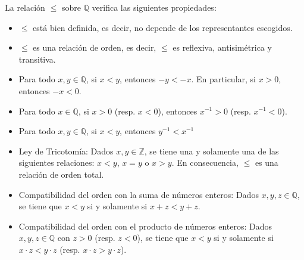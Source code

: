 \begin{proposition}
  \rm La relación $\leq$ sobre $\mathbb{Q}$ verifica las siguientes propiedades:
  \begin{itemize}
    \item[1.] $\leq$ está bien definida, es decir, no depende de los representantes escogidos.
    \item[2.] $\leq$ es una relación de orden, es decir, $\leq$ es reflexiva, antisimétrica y transitiva.
    \item[3.] Para todo $x,y\in\mathbb{Q}$, si $x<y$, entonces $-y<-x$. En particular, si $x>0$, entonces $-x<0$.
    \item[4.] Para todo $x\in\mathbb{Q}$, si $x>0$ (resp. $x<0$), entonces $x^{-1}>0$ (resp. $x^{-1}<0$).
    \item[5.] Para todo $x,y\in\mathbb{Q}$, si $x<y$, entonces $y^{-1}<x^{-1}$ 
    \item[6.] Ley de Tricotomía: Dados $x,y\in\mathbb{Z}$, se tiene una y solamente una de las siguientes relaciones: $x<y$, $x=y$ o $x>y$. En consecuencia, $\leq$ es una relación de orden total.
    \item[7.] Compatibilidad del orden con la suma de números enteros: Dados $x,y,z\in\mathbb{Q}$, se tiene que $x<y$ si y solamente si $x+z<y+z$.
    \item[8.] Compatibilidad del orden con el producto de números enteros: Dados $x,y,z\in\mathbb{Q}$ con $z>0$ (resp. $z<0$), se tiene que $x<y$ si y solamente si $x\cdot z<y\cdot z$ (resp. $x\cdot z>y\cdot z$).
  \end{itemize}
\end{proposition}



